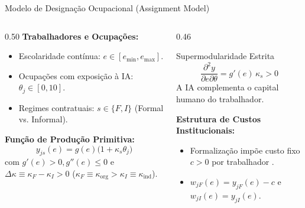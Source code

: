 \documentclass[aspectratio=169, 10pt]{beamer}
\begin{document}
\begin{frame}{Modelo de Designação Ocupacional (Assignment Model)}
    \begin{columns}[T]
        \begin{column}{0.50\textwidth}
            \textbf{Trabalhadores e Ocupações:}
            \begin{itemize}
                \item Escolaridade contínua: $e \in [e_{\min}, e_{\max}]$.
                \item Ocupações com exposição à IA: $\theta_j \in [0, 10]$.
                \item Regimes contratuais: $s \in \{F, I\}$ (Formal vs. Informal).
            \end{itemize}

            \vspace{0.3em}
            \textbf{Função de Produção Primitiva:}
            \begin{equation*}
                y_{js}(e) = g(e)\big(1 + \kappa_s \theta_j\big)
            \end{equation*}
            com $g'(e) > 0, g''(e) \le 0$ e $\Delta\kappa \equiv \kappa_F - \kappa_I > 0$
            ($\kappa_F \equiv \kappa_{\text{org}} > \kappa_I \equiv \kappa_{\text{ind}}$).
        \end{column}

        \begin{column}{0.46\textwidth}
            \begin{block}{Supermodularidade Estrita}
                \begin{equation*}
                    \frac{\partial^2 y}{\partial e \partial \theta} = g'(e)\,\kappa_s > 0
                \end{equation*}
                A IA complementa o capital humano do trabalhador.
            \end{block}

            \vspace{0.2em}
            \textbf{Estrutura de Custos Institucionais:}
            \begin{itemize}
                \item Formalização impõe custo fixo $c > 0$
                por trabalhador \citep{ulyssea2018firms}.
                \item $w_{jF}(e) = y_{jF}(e) - c$ e $w_{jI}(e) = y_{jI}(e)$.
            \end{itemize}
        \end{column}
    \end{columns}
\end{frame}
\end{document}
